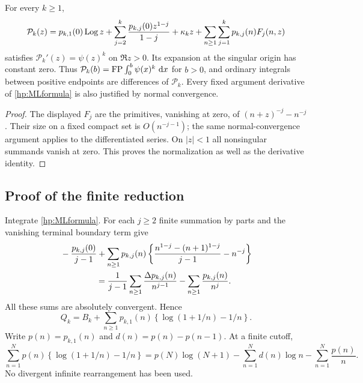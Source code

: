 \begin{corollary}\label{hp:primitive}
For every $k\ge1$,
\begin{equation}\label{hp:primitiveformula}
 \mathcal P_k(z)=p_{k,1}(0)\operatorname{Log} z+
      \sum_{j=2}^k\frac{p_{k,j}(0)z^{1-j}}{1-j}
      +\kappa_kz+
      \sum_{n\ge1}\sum_{j=1}^kp_{k,j}(n)F_j(n,z)
\end{equation}
satisfies $\mathcal P_k'(z)=\psi(z)^k$ on $\Re z>0$.
Its expansion at the singular origin has constant zero. Thus
$\mathcal P_k(b)=\operatorname{FP}\int_0^b\psi(x)^k\,\,\mathrm d x$ for $b>0$, and
ordinary integrals between positive endpoints are differences of
$\mathcal P_k$. Every fixed argument derivative of
\eqref{hp:MLformula} is also justified by normal convergence.
\end{corollary}

\begin{proof}
The displayed $F_j$ are the primitives, vanishing at zero, of
$(n+z)^{-j}-n^{-j}$. Their size on a fixed compact set is
$O(n^{-j-1})$; the same normal-convergence argument applies to
the differentiated series. On $|z|<1$ all nonsingular summands
vanish at zero. This proves the normalization as well as the
derivative identity.
\end{proof}

\subsection{Proof of the finite reduction}

Integrate \eqref{hp:MLformula}. For each $j\ge2$ finite summation by
parts and the vanishing terminal boundary term give
\begin{align*}
 &-\frac{p_{k,j}(0)}{j-1}
   +\sum_{n\ge1}p_{k,j}(n)
       \left\{\frac{n^{1-j}-(n+1)^{1-j}}{j-1}-n^{-j}\right\}\\
 &\hspace{15mm}=
   \frac1{j-1}\sum_{n\ge1}\frac{\Delta p_{k,j}(n)}{n^{j-1}}
         -\sum_{n\ge1}\frac{p_{k,j}(n)}{n^j}.
\end{align*}
All these sums are absolutely convergent. Hence
\begin{equation}\label{hp:afterintegration}
 Q_k=B_k+\sum_{n\ge1}p_{k,1}(n)
             \left\{\log(1+1/n)-1/n\right\}.
\end{equation}
Write $p(n)=p_{k,1}(n)$ and $d(n)=p(n)-p(n-1)$. At a finite cutoff,
\begin{equation}\label{hp:finiteparts}
 \sum_{n=1}^Np(n)\left\{\log(1+1/n)-1/n\right\}
 =p(N)\log(N+1)-\sum_{n=1}^Nd(n)\log n
                         -\sum_{n=1}^N\frac{p(n)}n.
\end{equation}
No divergent infinite rearrangement has been used.

